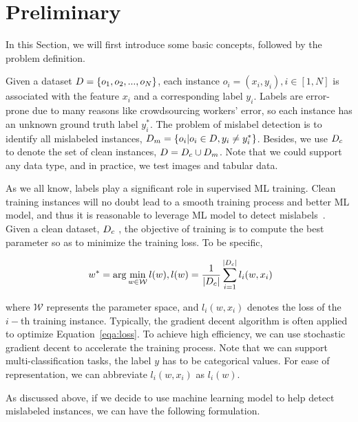 \section{Preliminary} 
\label{sec:pre}

In this Section, we will first introduce some basic concepts, followed by  the problem definition.

 Given a dataset $D=\{o_1, o_2, ..., o_N\}$, each instance  $o_i = (x_i, y_i), i\in [1,N]$ is associated with the feature $x_i$ and a corresponding label $y_i$. Labels are error-prone due to many reasons like crowdsourcing workers' error, so each instance has an unknown ground truth label $y_i^*$. The problem of mislabel detection is to identify all mislabeled instances, \ie $D_m = \{o_i|o_i\in D, y_i \neq y_i^*\}$. Besides, we use $D_c$ to denote the set of clean instances, \ie $D = D_c \cup D_m$.
Note that  we could  support any data type, and in practice, we test images and tabular data.

 As we all know, labels play a significant role in supervised ML training.
Clean training instances will no doubt lead to a smooth training process and better ML model, and thus it is reasonable to leverage ML model to detect mislabels~\cite{}. Given a clean dataset, \eg  $D_c$ , the objective of training  is to compute the best parameter so as to minimize the training loss. To be specific, 

\begin{equation}~\label{eqa:loss}
	w^* = \arg\min\limits_{w\in \mathcal{W}} l(w), l(w)= \frac{1}{|D_c|}\sum_{i=1}^{|D_c|} l_i(w, x_i)
\end{equation}

\noindent where $\mathcal{W}$ represents the parameter space, and $l_i(w, x_i)$ denotes the loss of the $i-$th training instance. Typically, the gradient decent algorithm is often applied to optimize Equation~\ref{eqa:loss}. To achieve high efficiency, we can use stochastic gradient decent to accelerate the training process. Note that we can support multi-classification tasks, \ie the label $y$ has to be categorical values. For ease of representation, we can abbreviate $l_i(w, x_i)$ as $l_i(w)$.



 As discussed above, if we decide to use machine learning model to help detect mislabeled instances, we can have the following formulation.

